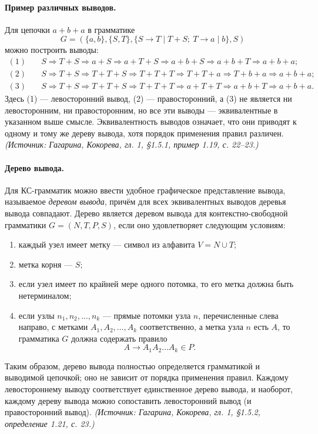 \documentclass[a4paper,12pt]{article}
\begin{document}
\paragraph{Пример различных выводов.}
Для цепочки \(a+b+a\) в грамматике
\[
G=(\{a,b\},\{S,T\},\{S\to T\mid T+S;\ T\to a\mid b\},S)
\]
можно построить выводы:
\[
\begin{aligned}
(1)\quad & S\Rightarrow T+S\Rightarrow a+S\Rightarrow a+T+S\Rightarrow a+b+S\Rightarrow a+b+T\Rightarrow a+b+a;\\
(2)\quad & S\Rightarrow T+S\Rightarrow T+T+S\Rightarrow T+T+T\Rightarrow T+T+a\Rightarrow T+b+a\Rightarrow a+b+a;\\
(3)\quad & S\Rightarrow T+S\Rightarrow T+T+S\Rightarrow T+T+T\Rightarrow a+T+T\Rightarrow a+b+T\Rightarrow a+b+a.
\end{aligned}
\]
Здесь (1) — левосторонний вывод, (2) — правосторонний, а (3) не является ни левосторонним, ни правосторонним, но все эти выводы — эквивалентные в указанном выше смысле. Эквивалентность выводов означает, что они приводят к одному и тому же дереву вывода, хотя порядок применения правил различен.
\textit{(Источник: Гагарина, Кокорева, гл. 1, §1.5.1, пример 1.19, с. 22--23.)}

\paragraph{Дерево вывода.}
Для КС-грамматик можно ввести удобное графическое представление вывода, называемое \emph{деревом вывода}, причём для всех эквивалентных выводов деревья вывода совпадают. Дерево является деревом вывода для контекстно-свободной грамматики \(G=(N,T,P,S)\), если оно удовлетворяет следующим условиям:
\begin{enumerate}[label=\arabic*)]
\item каждый узел имеет метку — символ из алфавита \(V=N\cup T\);
\item метка корня — \(S\);
\item если узел имеет по крайней мере одного потомка, то его метка должна быть нетерминалом;
\item если узлы \(n_1,n_2,\ldots,n_k\) — прямые потомки узла \(n\), перечисленные слева направо, с метками \(A_1,A_2,\ldots,A_k\) соответственно, а метка узла \(n\) есть \(A\), то грамматика \(G\) должна содержать правило
\[
A\to A_1A_2\ldots A_k\in P.
\]
\end{enumerate}
Таким образом, дерево вывода полностью определяется грамматикой и выводимой цепочкой; оно не зависит от порядка применения правил. Каждому левостороннему выводу соответствует единственное дерево вывода, и наоборот, каждому дереву вывода можно сопоставить левосторонний вывод (и правосторонний вывод).
\textit{(Источник: Гагарина, Кокорева, гл. 1, §1.5.2, определение 1.21, с. 23.)}
\end{document}
